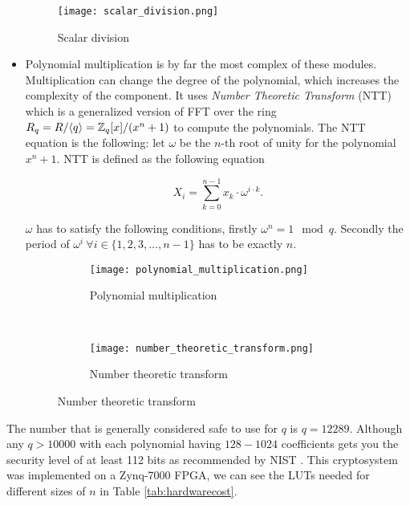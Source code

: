 \begin{itemize}
        \begin{figure}[H]
            \centering
            \texttt{[image: scalar\_division.png]}
            \caption{Scalar division \citep{FPGA_Post_Quantum_Primitives}}
            \label{fig:scalar_div}
        \end{figure}


    \item
        Polynomial multiplication is by far the most complex of these modules.
        Multiplication can change the degree of the polynomial, which increases
        the complexity of the component. It uses \textit{Number Theoretic
        Transform} (NTT) which is a generalized version of FFT over the ring
        $R_q = R / \langle q \rangle = \mathbb{Z}_q [x] / (x^n + 1)$ to compute the
        polynomials. The NTT equation is the following: let $\omega$ be the
        $n$-th root of unity for the polynomial $x^n + 1$. NTT is defined as
        the following equation

        \[ X_i = \sum^{n-1}_{k=0} x_k \cdot \omega^{i\cdot k}. \]

        $\omega$ has to satisfy the following conditions, firstly
        $\omega^n = 1 \mod q$. Secondly the period of
        $\omega^i \ \forall i \in \{1, 2, 3, \ldots, n - 1\}$ has to be exactly
        $n$.

        \begin{figure}[H]
            \centering
            \begin{subfigure}[b]{0.4\textwidth}
                \centering
                \texttt{[image: polynomial\_multiplication.png]}
                \caption{Polynomial multiplication \citep{FPGA_Post_Quantum_Primitives}}
                \label{fig:poly_mul}
            \end{subfigure}
            ~
            \begin{subfigure}[b]{0.4\textwidth}
                \centering
                \texttt{[image: number\_theoretic\_transform.png]}
                \caption{Number theoretic transform
                \citep{FPGA_Post_Quantum_Primitives}}
                \label{fig:ntt}
            \end{subfigure}
        \end{figure}

\end{itemize}


The number that is generally considered safe to use for $q$ is $q = 12289$. Although any $q > 10 000$
with each polynomial having $128 - 1024$ coefficients gets you the security
level of at least 112 bits as recommended by NIST
\citep{FPGA_Post_Quantum_Primitives}. This cryptosystem was implemented on a
Zynq-7000 FPGA, we can see the LUTs needed for different sizes of $n$ in Table
\ref{tab:hardwarecost}.

